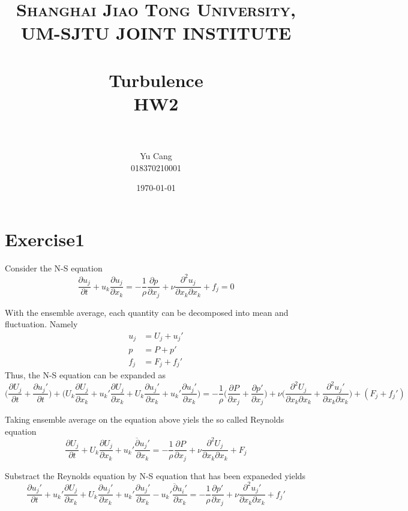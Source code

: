 \documentclass[paper=a4, fontsize=11pt]{scrartcl} %
\title{	
\normalfont \normalsize 
\textsc{Shanghai Jiao Tong University, UM-SJTU JOINT INSTITUTE} \\ [25pt] %
\horrule{0.5pt} \\[0.4cm] %
\huge Turbulence \\ HW2 \\ %
\horrule{2pt} \\[0.5cm] %
}
\author{Yu Cang \\ 018370210001}
\date{\normalsize \today}
\numberwithin{equation}{section} %
\numberwithin{figure}{section} %
\numberwithin{table}{section} %
\begin{document}
\maketitle

\section{Exercise1}
	Consider the N-S equation
	\begin{equation}
		\frac{\partial u_j}{\partial t} + u_k \frac{\partial u_j}{\partial x_k} = -\frac{1}{\rho}\frac{\partial p}{\partial x_j} + \nu \frac{\partial^2 u_j}{\partial x_k \partial x_k} + f_j = 0
	\end{equation}
	
	With the ensemble average, each quantity can be decomposed into mean and fluctuation. Namely
	\begin{equation}
		\begin{aligned}
			u_j & = U_j + u_j'\\
			p & = P + p'\\
			f_j &= F_j + f_j'
		\end{aligned}
	\end{equation}
	Thus, the N-S equation can be expanded as
	\begin{equation}
		\Bigg(\frac{\partial U_j}{\partial t} + \frac{\partial u_j'}{\partial t}\Bigg) + \Bigg(U_k\frac{\partial U_j}{\partial x_k} + u_k'\frac{\partial U_j}{\partial x_k} + U_k \frac{\partial u_j'}{\partial x_k} + u_k'\frac{\partial u_j'}{\partial x_k}\Bigg) = -\frac{1}{\rho}\Bigg(\frac{\partial P}{\partial x_j} + \frac{\partial p'}{\partial x_j}\Bigg) + \nu \Bigg(\frac{\partial^2 U_j}{\partial x_k \partial x_k} + \frac{\partial^2 u_j'}{\partial x_k \partial x_k}\Bigg) + (F_j + f_j')
	\end{equation}
	
	Taking ensemble average on the equation above yiels the so called Reynolds equation
	\begin{equation}
		\frac{\partial U_j}{\partial t} + U_k \frac{\partial U_j}{\partial x_k} + \overline{u_k'\frac{\partial u_j'}{\partial x_k}} = -\frac{1}{\rho}\frac{\partial P}{\partial x_j} + \nu \frac{\partial^2 U_j}{\partial x_k \partial x_k} + F_j
	\end{equation}
	
	Substract the Reynolds equation by N-S equation that has been expaneded yields
	\begin{equation}
		\frac{\partial u_j'}{\partial t} + u_k'\frac{\partial U_j}{\partial x_k} + U_k \frac{\partial u_j'}{\partial x_k} + u_k'\frac{\partial u_j'}{\partial x_k} - \overline{u_k'\frac{\partial u_i'}{\partial x_k}} = -\frac{1}{\rho}\frac{\partial p'}{\partial x_j} + \nu \frac{\partial^2 u_j'}{\partial x_k \partial x_k} + f_j'
	\end{equation}
	
\end{document}
